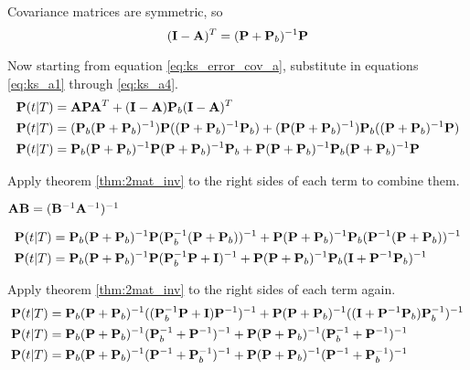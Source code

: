 Covariance matrices are symmetric, so
\begin{equation}
  (\mathbf{I} - \mathbf{A})^T = (\mathbf{P} + \mathbf{P}_b)^{-1}\mathbf{P} \label{eq:ks_a4}
\end{equation}

Now starting from equation \eqref{eq:ks_error_cov_a}, substitute in equations
\eqref{eq:ks_a1} through \eqref{eq:ks_a4}.
\begin{align*}
  \mathbf{P}(t|T) &=
    \mathbf{A}\mathbf{P}\mathbf{A}^T + (\mathbf{I} - \mathbf{A})\mathbf{P}_b(\mathbf{I} - \mathbf{A})^T
    \\
  \mathbf{P}(t|T) &=
    (\mathbf{P}_b(\mathbf{P} + \mathbf{P}_b)^{-1})\mathbf{P}
      ((\mathbf{P} + \mathbf{P}_b)^{-1}\mathbf{P}_b) +
    (\mathbf{P}(\mathbf{P} + \mathbf{P}_b)^{-1})\mathbf{P}_b
      ((\mathbf{P} + \mathbf{P}_b)^{-1}\mathbf{P}) \\
  \mathbf{P}(t|T) &=
    \mathbf{P}_b(\mathbf{P} + \mathbf{P}_b)^{-1}\mathbf{P}
    (\mathbf{P} + \mathbf{P}_b)^{-1}\mathbf{P}_b + \mathbf{P}
      (\mathbf{P} + \mathbf{P}_b)^{-1}\mathbf{P}_b
      (\mathbf{P} + \mathbf{P}_b)^{-1}\mathbf{P}
\end{align*}

Apply theorem \ref{thm:2mat_inv} to the right sides of each term to combine
them.
\begin{theorem}
  \label{thm:2mat_inv}

  $\mathbf{A}\mathbf{B} = (\mathbf{B}^{-1}\mathbf{A}^{-1})^{-1}$
\end{theorem}
\begin{align*}
  \mathbf{P}(t|T) &=
    \mathbf{P}_b(\mathbf{P} + \mathbf{P}_b)^{-1}\mathbf{P}
      (\mathbf{P}_b^{-1}(\mathbf{P} + \mathbf{P}_b))^{-1} +
    \mathbf{P}(\mathbf{P} + \mathbf{P}_b)^{-1}\mathbf{P}_b
      (\mathbf{P}^{-1}(\mathbf{P} + \mathbf{P}_b))^{-1} \\
  \mathbf{P}(t|T) &= \mathbf{P}_b(\mathbf{P} + \mathbf{P}_b)^{-1}\mathbf{P}
      (\mathbf{P}_b^{-1}\mathbf{P} + \mathbf{I})^{-1} +
    \mathbf{P}(\mathbf{P} + \mathbf{P}_b)^{-1}\mathbf{P}_b
      (\mathbf{I} + \mathbf{P}^{-1}\mathbf{P}_b)^{-1}
\end{align*}

Apply theorem \ref{thm:2mat_inv} to the right sides of each term again.
\begin{align*}
  \mathbf{P}(t|T) &=
    \mathbf{P}_b(\mathbf{P} + \mathbf{P}_b)^{-1}
      ((\mathbf{P}_b^{-1}\mathbf{P} + \mathbf{I})\mathbf{P}^{-1})^{-1} +
    \mathbf{P}(\mathbf{P} + \mathbf{P}_b)^{-1}
      ((\mathbf{I} + \mathbf{P}^{-1}\mathbf{P}_b)\mathbf{P}_b^{-1})^{-1} \\
  \mathbf{P}(t|T) &=
    \mathbf{P}_b(\mathbf{P} + \mathbf{P}_b)^{-1}(\mathbf{P}_b^{-1} + \mathbf{P}^{-1})^{-1} +
    \mathbf{P}(\mathbf{P} + \mathbf{P}_b)^{-1}(\mathbf{P}_b^{-1} + \mathbf{P}^{-1})^{-1} \\
  \mathbf{P}(t|T) &= \mathbf{P}_b(\mathbf{P} + \mathbf{P}_b)^{-1}
    (\mathbf{P}^{-1} + \mathbf{P}_b^{-1})^{-1} +
    \mathbf{P}(\mathbf{P} + \mathbf{P}_b)^{-1}(\mathbf{P}^{-1} + \mathbf{P}_b^{-1})^{-1}
\end{align*}

